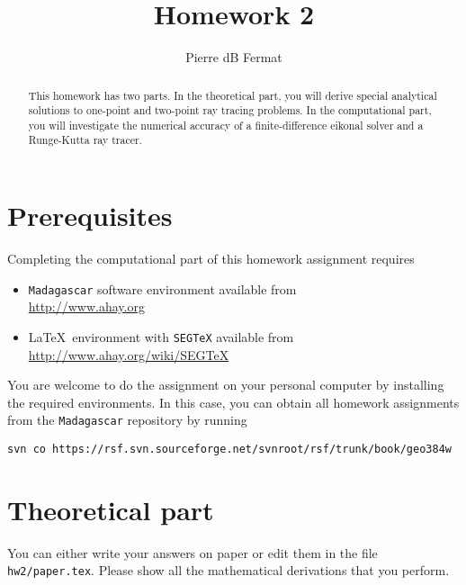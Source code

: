 \author{Pierre dB Fermat} 
\title{Homework 2}

\begin{abstract}
  This homework has two parts. In the theoretical part, you will
  derive special analytical solutions to one-point and two-point ray
  tracing problems. In the computational part, you will investigate
  the numerical accuracy of a finite-difference eikonal solver and
  a Runge-Kutta ray tracer.
\end{abstract}

\section{Prerequisites}

Completing the computational part of this homework assignment requires
\begin{itemize}
\item \texttt{Madagascar} software environment available from \\
  \url{http://www.ahay.org}
\item \LaTeX\ environment with \texttt{SEGTeX} available from \\ 
  \url{http://www.ahay.org/wiki/SEGTeX}
\end{itemize}

You are welcome to do the assignment on your personal computer by
installing the required environments. In this case, you can obtain all
homework assignments from the \texttt{Madagascar} repository by running
\begin{verbatim}
svn co https://rsf.svn.sourceforge.net/svnroot/rsf/trunk/book/geo384w 
\end{verbatim}

\section{Theoretical part}

You can either write your answers on paper or edit them in the file
\verb#hw2/paper.tex#. Please show all the mathematical
derivations that you perform.

